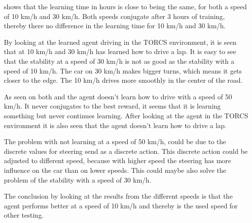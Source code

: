  shows that the learning time in hours is close to being the same, for both a speed of 10 km/h and 30 km/h. Both speeds conjugate after 3 hours of training, thereby there no difference in the learning time for 10 km/h and 30 km/h.

By looking at the learned agent driving in the TORCS environment, it is seen that at 10 km/h and 30 km/h has learned how to drive a lap. It is easy to see that the stability at a speed of 30 km/h is not as good as the stability with a speed of 10 km/h. The car on 30 km/h makes bigger turns, which means it gets closer to the edge. The 10 km/h drives more smoothly in the center of the road.

As seen on both  and  the agent doesn't learn how to drive with a speed of 50 km/h. It never conjugates to the best reward, it seems that it is learning something but never continues learning. After looking at the agent in the TORCS environment it is also seen that the agent doesn’t learn how to drive a lap.

The problem with not learning at a speed of 50 km/h, could be due to the discrete values for steering send as a discrete action. This discrete action could be adjusted to different speed, because with higher speed the steering has more influence on the car than on lower speeds. This could maybe also solve the problem of the stability with a speed of 30 km/h. 

The conclusion by looking at the results from the different speeds is that the agent performs better at a speed of 10 km/h and thereby is the used speed for other testing. 
    